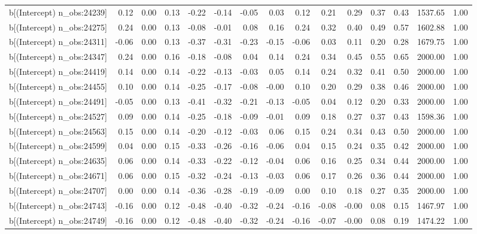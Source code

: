 \begin{table}[ht]
\begin{tabular}{rrrrrrrrrrrrrrr}
  b[(Intercept) n\_obs:24239] & 0.12 & 0.00 & 0.13 & -0.22 & -0.14 & -0.05 & 0.03 & 0.12 & 0.21 & 0.29 & 0.37 & 0.43 & 1537.65 & 1.00 \\ 
  b[(Intercept) n\_obs:24275] & 0.24 & 0.00 & 0.13 & -0.08 & -0.01 & 0.08 & 0.16 & 0.24 & 0.32 & 0.40 & 0.49 & 0.57 & 1602.88 & 1.00 \\ 
  b[(Intercept) n\_obs:24311] & -0.06 & 0.00 & 0.13 & -0.37 & -0.31 & -0.23 & -0.15 & -0.06 & 0.03 & 0.11 & 0.20 & 0.28 & 1679.75 & 1.00 \\ 
  b[(Intercept) n\_obs:24347] & 0.24 & 0.00 & 0.16 & -0.18 & -0.08 & 0.04 & 0.14 & 0.24 & 0.34 & 0.45 & 0.55 & 0.65 & 2000.00 & 1.00 \\ 
  b[(Intercept) n\_obs:24419] & 0.14 & 0.00 & 0.14 & -0.22 & -0.13 & -0.03 & 0.05 & 0.14 & 0.24 & 0.32 & 0.41 & 0.50 & 2000.00 & 1.00 \\ 
  b[(Intercept) n\_obs:24455] & 0.10 & 0.00 & 0.14 & -0.25 & -0.17 & -0.08 & -0.00 & 0.10 & 0.20 & 0.29 & 0.38 & 0.46 & 2000.00 & 1.00 \\ 
  b[(Intercept) n\_obs:24491] & -0.05 & 0.00 & 0.13 & -0.41 & -0.32 & -0.21 & -0.13 & -0.05 & 0.04 & 0.12 & 0.20 & 0.33 & 2000.00 & 1.00 \\ 
  b[(Intercept) n\_obs:24527] & 0.09 & 0.00 & 0.14 & -0.25 & -0.18 & -0.09 & -0.01 & 0.09 & 0.18 & 0.27 & 0.37 & 0.43 & 1598.36 & 1.00 \\ 
  b[(Intercept) n\_obs:24563] & 0.15 & 0.00 & 0.14 & -0.20 & -0.12 & -0.03 & 0.06 & 0.15 & 0.24 & 0.34 & 0.43 & 0.50 & 2000.00 & 1.00 \\ 
  b[(Intercept) n\_obs:24599] & 0.04 & 0.00 & 0.15 & -0.33 & -0.26 & -0.16 & -0.06 & 0.04 & 0.15 & 0.24 & 0.35 & 0.42 & 2000.00 & 1.00 \\ 
  b[(Intercept) n\_obs:24635] & 0.06 & 0.00 & 0.14 & -0.33 & -0.22 & -0.12 & -0.04 & 0.06 & 0.16 & 0.25 & 0.34 & 0.44 & 2000.00 & 1.00 \\ 
  b[(Intercept) n\_obs:24671] & 0.06 & 0.00 & 0.15 & -0.32 & -0.24 & -0.13 & -0.03 & 0.06 & 0.17 & 0.26 & 0.36 & 0.44 & 2000.00 & 1.00 \\ 
  b[(Intercept) n\_obs:24707] & 0.00 & 0.00 & 0.14 & -0.36 & -0.28 & -0.19 & -0.09 & 0.00 & 0.10 & 0.18 & 0.27 & 0.35 & 2000.00 & 1.00 \\ 
  b[(Intercept) n\_obs:24743] & -0.16 & 0.00 & 0.12 & -0.48 & -0.40 & -0.32 & -0.24 & -0.16 & -0.08 & -0.00 & 0.08 & 0.15 & 1467.97 & 1.00 \\ 
  b[(Intercept) n\_obs:24749] & -0.16 & 0.00 & 0.12 & -0.48 & -0.40 & -0.32 & -0.24 & -0.16 & -0.07 & -0.00 & 0.08 & 0.19 & 1474.22 & 1.00 \\ 

\end{tabular}
\end{table}
